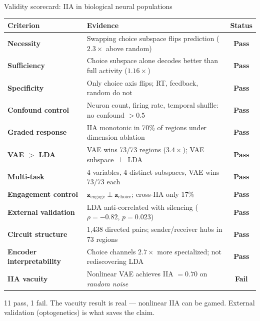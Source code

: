 \documentclass[aspectratio=169,11pt]{beamer}
\begin{document}
\begin{frame}{Validity scorecard: IIA in biological neural populations}
\vspace{-0.5em}
{\scriptsize
\begin{tabular}{lp{7cm}c}
\toprule
\textbf{Criterion} & \textbf{Evidence} & \textbf{Status} \\
\midrule
\textbf{Necessity} & Swapping choice subspace flips prediction ($2.3\times$ above random) & \textcolor{pass}{\textbf{Pass}} \\
\textbf{Sufficiency} & Choice subspace alone decodes better than full activity ($1.16\times$) & \textcolor{pass}{\textbf{Pass}} \\
\textbf{Specificity} & Only choice axis flips; RT, feedback, random do not & \textcolor{pass}{\textbf{Pass}} \\
\textbf{Confound control} & Neuron count, firing rate, temporal shuffle: no confound $> 0.5$ & \textcolor{pass}{\textbf{Pass}} \\
\textbf{Graded response} & IIA monotonic in 70\% of regions under dimension ablation & \textcolor{pass}{\textbf{Pass}} \\
\textbf{VAE $>$ LDA} & VAE wins 73/73 regions ($3.4\times$); VAE subspace $\perp$ LDA & \textcolor{pass}{\textbf{Pass}} \\
\textbf{Multi-task} & 4 variables, 4 distinct subspaces, VAE wins 73/73 each & \textcolor{pass}{\textbf{Pass}} \\
\textbf{Engagement control} & $\mathbf{z}_{\text{engage}} \perp \mathbf{z}_{\text{choice}}$; cross-IIA only 17\% & \textcolor{pass}{\textbf{Pass}} \\
\textbf{External validation} & LDA anti-correlated with silencing ($\rho = -0.82$, $p = 0.023$) & \textcolor{pass}{\textbf{Pass}} \\
\textbf{Circuit structure} & 1,438 directed pairs; sender/receiver hubs in 73 regions & \textcolor{pass}{\textbf{Pass}} \\
\textbf{Encoder interpretability} & Choice channels $2.7\times$ more specialized; not rediscovering LDA & \textcolor{pass}{\textbf{Pass}} \\
\midrule
\textbf{IIA vacuity} & Nonlinear VAE achieves IIA $= 0.70$ on \emph{random noise} & \textcolor{fail}{\textbf{Fail}} \\
\bottomrule
\end{tabular}
}

\vspace{0.3em}
{\small 11 pass, 1 fail. The vacuity result is real --- nonlinear IIA can be gamed. External validation (optogenetics) is what saves the claim.}
\end{frame}
\end{document}
